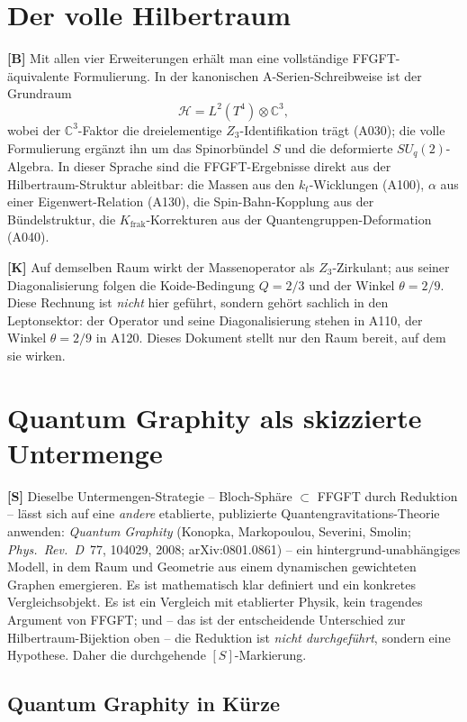\section{Der volle Hilbertraum}

\textbf{[B]} Mit allen vier Erweiterungen erhält man eine vollständige
FFGFT-äquivalente Formulierung. In der kanonischen A-Serien-Schreibweise ist der
Grundraum
\[
  \mathcal{H} = L^2(T^4)\otimes\mathbb{C}^3,
\]
wobei der $\mathbb{C}^3$-Faktor die dreielementige $Z_3$-Identifikation trägt
(A030); die volle Formulierung ergänzt ihn um das Spinorbündel $S$ und die
deformierte $SU_q(2)$-Algebra. In dieser Sprache sind die FFGFT-Ergebnisse direkt
aus der Hilbertraum-Struktur ableitbar: die Massen aus den $k_t$-Wicklungen
(A100), $\alpha$ aus einer Eigenwert-Relation (A130), die Spin-Bahn-Kopplung aus
der Bündelstruktur, die $K_{\text{frak}}$-Korrekturen aus der
Quantengruppen-Deformation (A040).

\textbf{[K]} Auf demselben Raum wirkt der Massenoperator als $Z_3$-Zirkulant; aus
seiner Diagonalisierung folgen die Koide-Bedingung $Q=2/3$ und der Winkel
$\theta=2/9$. Diese Rechnung ist \emph{nicht} hier geführt, sondern gehört
sachlich in den Leptonsektor: der Operator und seine Diagonalisierung stehen in
A110, der Winkel $\theta=2/9$ in A120. Dieses Dokument stellt nur den Raum
bereit, auf dem sie wirken.

\section{Quantum Graphity als skizzierte Untermenge}

\textbf{[S]} Dieselbe Untermengen-Strategie -- Bloch-Sphäre $\subset$ FFGFT durch
Reduktion -- lässt sich auf eine \emph{andere} etablierte, publizierte
Quantengravitations-Theorie anwenden: \emph{Quantum Graphity} (Konopka,
Markopoulou, Severini, Smolin; \emph{Phys.~Rev.~D}~77, 104029, 2008;
arXiv:0801.0861) -- ein hintergrund-unabhängiges Modell, in dem Raum und
Geometrie aus einem dynamischen gewichteten Graphen emergieren. Es ist
mathematisch klar definiert und ein konkretes Vergleichsobjekt. Es ist ein
Vergleich mit etablierter Physik, kein tragendes Argument von FFGFT; und -- das
ist der entscheidende Unterschied zur Hilbertraum-Bijektion oben -- die Reduktion
ist \emph{nicht durchgeführt}, sondern eine Hypothese. Daher die durchgehende
$[S]$-Markierung.

\subsection*{Quantum Graphity in Kürze}

